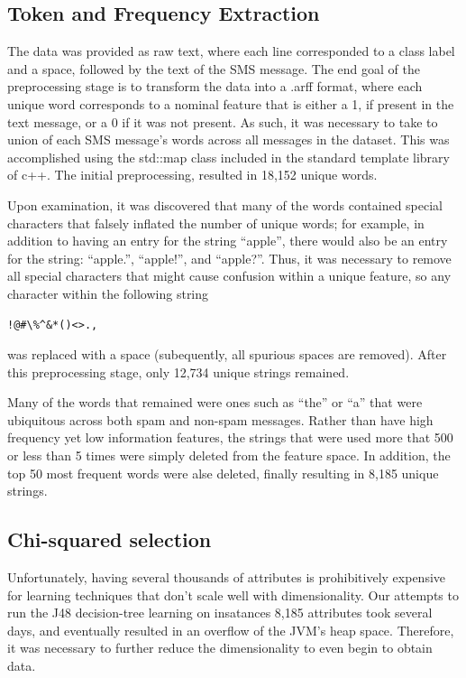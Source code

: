 \documentclass[letterpaper, 10 pt, conference]{ieeeconf}  %
\begin{document}
\subsection{Token and Frequency Extraction}

The data was provided as raw text, where each line corresponded to a
class label and a space, followed by the text of the SMS message. The
end goal of the preprocessing stage is to transform the data into a
.arff format, where each unique word corresponds to a nominal feature
that is either a 1, if present in the text message, or a 0 if it was
not present. As such, it was necessary to take to union of each SMS
message's words across all messages in the dataset. This was
accomplished using the std::map class included in the standard
template library of c++.  The initial preprocessing, resulted in
18,152 unique words.  

Upon examination, it was discovered that many of the words contained
special characters that falsely inflated the number of unique words;
for example, in addition to having an entry for the string ``apple'',
there would also be an entry for the string: ``apple.'', ``apple!'',
and ``apple?''. Thus, it was necessary to remove all special
characters that might cause confusion within a unique feature, so any
character within the following
string \begin{verbatim}!@#\%^&*()<>.,\end{verbatim} was replaced with
a space (subequently, all spurious spaces are removed). After this
preprocessing stage, only 12,734 unique strings remained.

Many of the words that remained were ones such as ``the'' or ``a''
that were ubiquitous across both spam and non-spam messages. Rather
than have high frequency yet low information features, the strings
that were used more that 500 or less than 5 times were simply deleted
from the feature space. In addition, the top 50 most frequent words
were alse deleted, finally resulting in 8,185 unique strings. 

\subsection{Chi-squared selection}

Unfortunately, having several thousands of attributes is prohibitively
expensive for learning techniques that don't scale well with
dimensionality. Our attempts to run the J48 decision-tree learning on
insatances 8,185 attributes took several days, and eventually resulted
in an overflow of the JVM's heap space. Therefore, it was necessary to
further reduce the dimensionality to even begin to obtain data.
\end{document}
